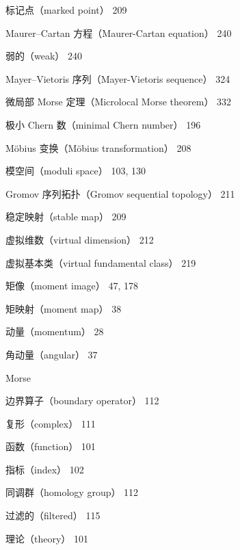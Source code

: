 {\noindent 标记点（marked point） 209\par
\noindent Maurer–Cartan 方程（Maurer-Cartan equation） 240\par
\noindent\hspace*{1.5em}弱的（weak） 240\par
\noindent Mayer–Vietoris 序列（Mayer-Vietoris sequence） 324\par
\noindent 微局部 Morse 定理（Microlocal Morse theorem） 332\par
\noindent 极小 Chern 数（minimal Chern number） 196\par
\noindent Möbius 变换（Möbius transformation） 208\par
\noindent 模空间（moduli space） 103, 130\par
\noindent\hspace*{1.5em}Gromov 序列拓扑（Gromov sequential topology） 211\par
\noindent\hspace*{1.5em}稳定映射（stable map） 209\par
\noindent\hspace*{1.5em}虚拟维数（virtual dimension） 212\par
\noindent\hspace*{1.5em}虚拟基本类（virtual fundamental class） 219\par
\noindent 矩像（moment image） 47, 178\par
\noindent 矩映射（moment map） 38\par
\noindent 动量（momentum） 28\par
\noindent\hspace*{1.5em}角动量（angular） 37\par
\noindent Morse\par
\noindent\hspace*{1.5em}边界算子（boundary operator） 112\par
\noindent\hspace*{1.5em}复形（complex） 111\par
\noindent\hspace*{1.5em}函数（function） 101\par
\noindent\hspace*{3em}指标（index） 102\par
\noindent\hspace*{1.5em}同调群（homology group） 112\par
\noindent\hspace*{3em}过滤的（filtered） 115\par
\noindent\hspace*{1.5em}理论（theory） 101\par
}
